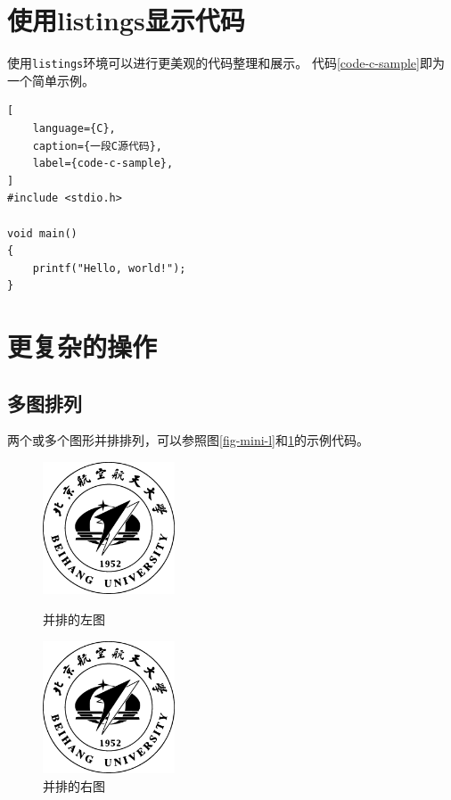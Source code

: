 \section{使用listings显示代码}
\label{sec-listings}
使用\texttt{listings}环境可以进行更美观的代码整理和展示。
代码\ref{code-c-sample}即为一个简单示例。
\begin{lstlisting}[
    language={C},
    caption={一段C源代码},
    label={code-c-sample},
]
#include <stdio.h>

void main()
{
    printf("Hello, world!");
}
\end{lstlisting}

\section{更复杂的操作}
\label{sec-more}

\subsection{多图排列}
\label{subsec-multi-fig}
两个或多个图形并排排列，可以参照图\ref{fig-mini-l}和\ref{fig-mini-r}的示例代码。
\begin{figure}[h!] %
    \begin{minipage}{.5\textwidth} %
        \centering
        \includegraphics[width=0.35\textwidth]{figure/buaamark.eps}
        \caption{并排的左图}
        \label{fig-mini-l}
    \end{minipage}
    \begin{minipage}{.5\textwidth}
        \centering
        \includegraphics[width=0.35\textwidth]{figure/buaamark.eps}
        \caption{并排的右图}
        \label{fig-mini-r}
    \end{minipage}
\end{figure}

